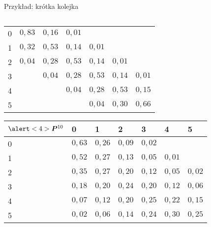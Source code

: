 \documentclass{mp}
\begin{document}
\begin{frame}{Przykład: krótka kolejka}
{\begin{columns}[T]
\begin{column}{.49\textwidth}
{{\begin{tabular}{l|llllll}
0 & $0{,}83$ & $0{,}16$ & $0{,}01$ &  &  & \\
1 & $0{,}32$ & $0{,}53$ & $0{,}14$ & $0{,}01$ &  &  \\
2 & $0{,}04$ & $0{,}28$ & $0{,}53$ & $0{,}14$ & $0{,}01$ & \\
3 &  & $0{,}04$ & $0{,}28$ & $0{,}53$ & $0{,}14$ & $0{,}01$ \\
4 &  &  & $0{,}04$ & $0{,}28$ & $0{,}53$ & $0{,}15$ \\
5 &  &  &  & $0{,}04$ & $0{,}30$ & $0{,}66$
\end{tabular}
}
{
\begin{tabular}{l|llllll}
$\alert<4>{\bm{P}^{10}}$ & 0 & 1 & 2 & 3 & 4 & 5\\
\hline
 0 &  $0{,}63$ & $0{,}26$ & $0{,}09$ & $0{,}02$ &  &  \\
 1 &  $0{,}52$ & $0{,}27$ & $0{,}13$ & $0{,}05$ & $0{,}01$ &  \\
 2 &  $0{,}35$ & $0{,}27$ & $0{,}20$ & $0{,}12$ & $0{,}05$ & $0{,}02$ \\
 3 &  $0{,}18$ & $0{,}20$ & $0{,}24$ & $0{,}20$ & $0{,}12$ & $0{,}06$ \\
 4 &  $0{,}07$ & $0{,}12$ & $0{,}20$ & $0{,}25$ & $0{,}22$ & $0{,}15$ \\
 5 &  $0{,}02$ & $0{,}06$ & $0{,}14$ & $0{,}24$ & $0{,}30$ & $0{,}25$ \\
\end{tabular}
}
}
\end{column}
\end{columns}
}
\end{frame}
\end{document}

